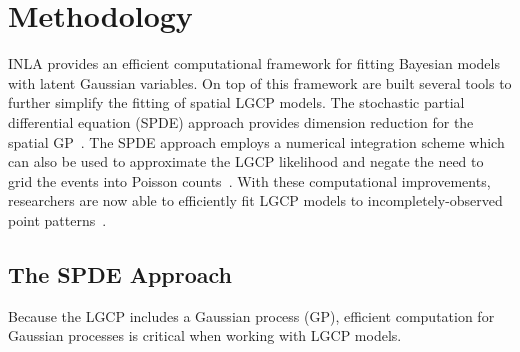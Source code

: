 \documentclass[]{interact}
\begin{document}










\section{Methodology}

INLA provides an efficient computational framework for fitting Bayesian models
with latent Gaussian variables. On top of this framework are built several
tools to further simplify the fitting of spatial LGCP models. The stochastic
partial differential equation (SPDE) approach provides dimension reduction for
the spatial GP~\cite{lindgrenetal}. The SPDE approach employs a numerical
integration scheme which can also be used to approximate the LGCP likelihood
and negate the need to grid the events into Poisson counts~\cite{simpsonetal}.
With these computational improvements, researchers are now able to efficiently
fit LGCP models to incompletely-observed point patterns~\cite{yuanetal}.  


\subsection{The SPDE Approach}

Because the LGCP includes a Gaussian process (GP), efficient computation for
Gaussian processes is critical when working with LGCP models.
\end{document}
